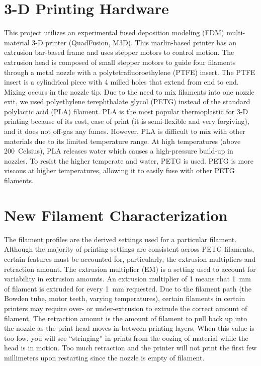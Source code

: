 \section{3-D Printing Hardware}
This project utilizes an experimental fused deposition modeling (FDM) multi-material 3-D printer (QuadFusion, M3D). This marlin-based printer has an extrusion bar-based frame and uses stepper motors to control motion. The extrusion head is composed of small stepper motors to guide four filaments through a metal nozzle with a polytetrafluoroethylene (PTFE) insert. The PTFE insert is a cylindrical piece with 4 milled holes that extend from end to end. Mixing occurs in the nozzle tip. Due to the need to mix filaments into one nozzle exit, we used polyethylene terephthalate glycol (PETG) instead of the standard polylactic acid (PLA) filament. PLA is the most popular thermoplastic for 3-D printing because of its cost, ease of print (it is semi-flexible and very forgiving), and it does not off-gas any fumes. However, PLA is difficult to mix with other materials due to its limited temperature range. At high temperatures (above 200\textdegree~Celsius), PLA releases water which causes a high-pressure build-up in nozzles. To resist the higher temperate and water, PETG is used. PETG is more viscous at higher temperatures, allowing it to easily fuse with other PETG filaments. 


\section{New Filament Characterization}
The filament profiles are the derived settings used for a particular filament. Although the majority of printing settings are consistent across PETG filaments, certain features must be accounted for, particularly, the extrusion multipliers and retraction amount. The extrusion multiplier (EM) is a setting used to account for variability in extrusion amounts. An extrusion multiplier of 1 means that 1~mm of filament is extruded for every 1~mm requested. Due to the filament path (the Bowden tube, motor teeth, varying temperatures), certain filaments in certain printers may require over- or under-extrusion to extrude the correct amount of filament. The retraction amount is the amount of filament to pull back up into the nozzle as the print head moves in between printing layers. When this value is too low, you will see ``stringing'' in prints from the oozing of material while the head is in motion. Too much retraction and the printer will not print the first few millimeters upon restarting since the nozzle is empty of filament.

